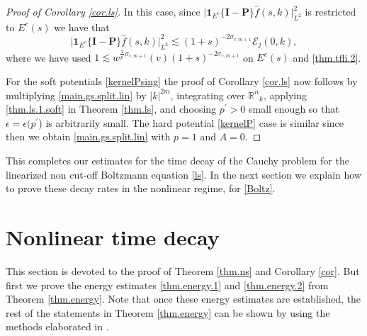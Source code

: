 \documentclass{amsart}
\numberwithin{equation}{section}
\begin{document}
\begin{proof}[Proof of Corollary \ref{cor.ls}]
In this case, 
since ${|} { {\mathbf 1}}_{E^c} \{{\mathbf{I}}-{\mathbf{P}}\}\hat{f}(s,k){|}^2_{L^2}$ is restricted to $E^c(s)$  we have that
\begin{equation}
\label{decay.high.lin}
{|} { {\mathbf 1}}_{E^c} \{{\mathbf{I}}-{\mathbf{P}}\}\hat{f}(s,k){|}^2_{L^2}
\lesssim
(1+s)^{-2\sigma_{r,m+1}} {\mathcal{E}}_{j}(0,k),
\end{equation}
where we have used 
$
1  \lesssim w^{\frac{2}{p^\prime} \sigma_{r,m+1} }(v) (1+s)^{-2\sigma_{r,m+1}}
$
on $E^c(s)$ and \eqref{thm.tfli.2}.  

For the soft potentials \eqref{kernelPsing} the proof of Corollary \ref{cor.ls} now follows by multiplying \eqref{main.gs.split.lin} by $|k|^{2m}$, integrating over ${{\mathbb R}^{n}}_k$, applying \eqref{thm.ls.1.soft} in  Theorem \ref{thm.ls}, and choosing $p^\prime>0$ small enough so that $\epsilon = \epsilon(p^\prime$) is arbitrarily small.  The hard potential \eqref{kernelP} case is similar since then we obtain \eqref{main.gs.split.lin} with $p=1$ and ${A}=0$.  \end{proof}

This completes our estimates for the time decay of the Cauchy problem for the linearized non cut-off Boltzmann equation \eqref{ls}.  In the next section we explain how to prove these decay rates in the nonlinear regime, for \eqref{Boltz}.  

\section{Nonlinear time decay}\label{sec.decayNL}

This section is devoted to the proof of Theorem \ref{thm.ns} and
Corollary \ref{cor}.   But first we prove the energy estimates \eqref{thm.energy.1} and \eqref{thm.energy.2} from Theorem \ref{thm.energy}.  Note that once these energy estimates are established, the rest of the statements in Theorem \ref{thm.energy} can be shown by using the methods elaborated in \cite{gsNonCut0}.  
\end{document}
